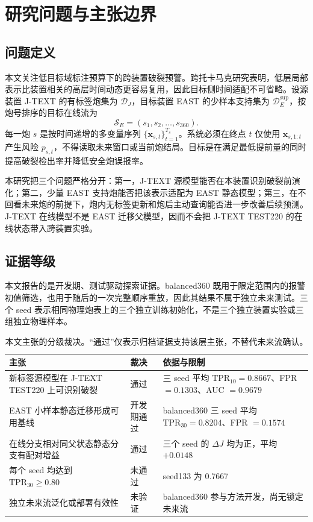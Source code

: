 \section{研究问题与主张边界}

\subsection{问题定义}

本文关注低目标域标注预算下的跨装置破裂预警。跨托卡马克研究表明，低层局部表示比装置相关的高层时间动态更容易复用，因此目标侧时间适配不可省略\citep{zheng2023transfer,shen2023physics}。设源装置 J-TEXT 的有标签炮集为 $\mathcal D_J$，目标装置 EAST 的少样本支持集为 $\mathcal D_E^{\mathrm{sup}}$，按炮号排序的目标在线流为
\[
\mathcal S_E=(s_1,s_2,\ldots,s_{360}).
\]
每一炮 $s$ 是按时间递增的多变量序列 $\{\mathbf x_{s,t}\}_{t=1}^{T_s}$。系统必须在终点 $t$ 仅使用 $\mathbf x_{s,1:t}$ 产生风险 $p_{s,t}$，不得读取未来窗口或当前炮结局。目标是在满足最低提前量的同时提高破裂检出率并降低安全炮误报率。

本研究把三个问题严格分开：第一，J-TEXT 源模型能否在本装置识别破裂前演化；第二，少量 EAST 支持炮能否把该表示适配为 EAST 静态模型；第三，在不回看未来炮的前提下，炮内无标签更新和炮后主动查询能否进一步改善后续预测。J-TEXT 在线模型不是 EAST 迁移父模型，因而不会把 J-TEXT TEST220 的在线状态带入跨装置实验。

\subsection{证据等级}

本文报告的是开发期、测试驱动探索证据。balanced360 既用于限定范围内的报警初值筛选，也用于随后的一次完整顺序重放，因此其结果不属于独立未来测试。三个 seed 表示相同物理炮表上的三个独立训练初始化，不是三个独立装置实验或三组独立物理样本。

\begin{table}[H]
\centering
\caption{本文主张的分级裁决。``通过''仅表示归档证据支持该层主张，不替代未来流确认。}
\label{tab:claims}
\begin{tabularx}{\textwidth}{@{}p{42mm}p{22mm}X@{}}
\toprule
主张 & 裁决 & 依据与限制\\
\midrule
新标签源模型在 J-TEXT TEST220 上可识别破裂 & 通过 & 三 seed 平均 $\mathrm{TPR}_{10}=0.8667$、FPR $=0.1303$、AUC $=0.9679$\\
EAST 小样本静态迁移形成可用基线 & 开发期通过 & balanced360 三 seed 平均 $\mathrm{TPR}_{30}=0.8204$、FPR $=0.1574$\\
在线分支相对同父状态静态分支有配对增益 & 通过 & 三个 seed 的 $\Delta J$ 均为正，平均 $+0.0148$\\
每个 seed 均达到 $\mathrm{TPR}_{30}\ge0.80$ & 未通过 & seed133 为 0.7667\\
独立未来流泛化或部署有效性 & 未验证 & balanced360 参与方法开发，尚无锁定未来流\\
\bottomrule
\end{tabularx}
\end{table}

